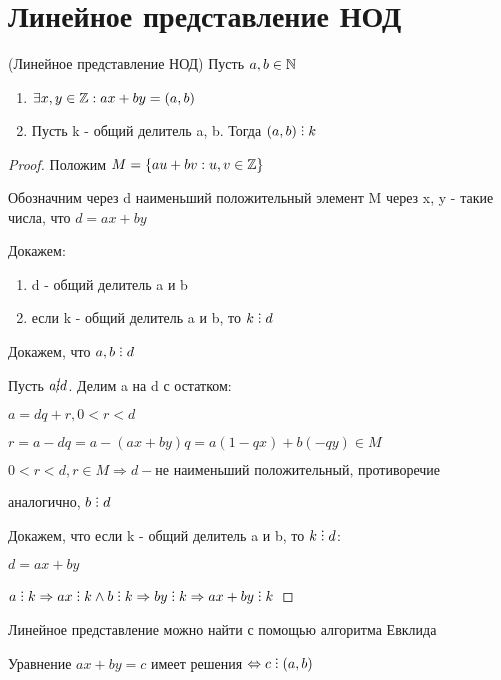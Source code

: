 \section{Линейное представление НОД}

\begin{theorem} (Линейное представление НОД)
  Пусть $a, b \in \mathbb{N}$
  \begin{enumerate}
    \item $\exists x, y \in \mathbb{Z}: ax + by = (a, b)$
    \item Пусть k - общий делитель a, b. Тогда $(a, b) \divby k$
  \end{enumerate}
\end{theorem}

\begin{proof}
  Положим $M = \{au + bv: u, v \in \mathbb{Z}\}$

  Обозначним через d наименьший положительный элемент M через x, y - такие числа, что $d = ax + by$

  Докажем:
  
  \begin{enumerate}
    \item d - общий делитель a и b
    \item если k - общий делитель a и b, то $k \divby d$
  \end{enumerate}

  Докажем, что $a, b \divby d$

  Пусть $a \cancel{\divby} d$. Делим a на d с остатком:

  $a = dq + r, 0 < r < d$

  $r = a - dq = a - (ax + by)q = a(1 - qx) + b(-qy) \in M$

  $0 < r < d, r \in M \Rightarrow d - \text{не наименьший положительный, противоречие}$

  аналогично, $b \divby d$

  Докажем, что если k - общий делитель a и b, то $k \divby d$:

  $d = ax + by$

  $a \divby k \Rightarrow ax \divby k \land b \divby k \Rightarrow by \divby k \Rightarrow ax + by \divby k$

\end{proof}

\begin{remark}
  Линейное представление можно найти с помощью алгоритма Евклида
\end{remark}

\begin{remark}
  Уравнение $ax + by = c$ имеет решения $\Leftrightarrow c \divby (a, b)$
\end{remark}

